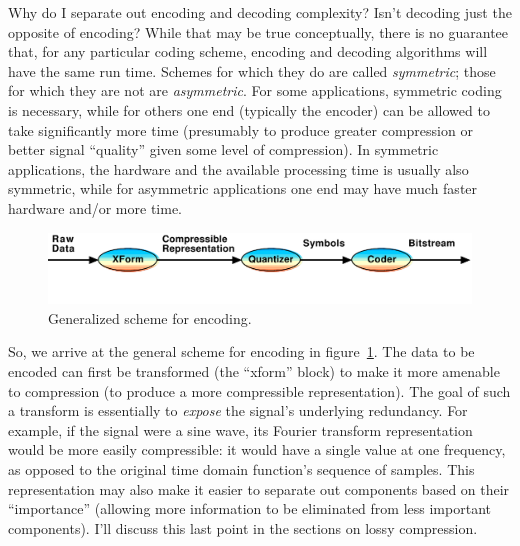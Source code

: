 Why do I separate out encoding and decoding complexity? Isn't decoding
just the opposite of encoding? While that may be true conceptually,
there is no guarantee that, for any particular coding scheme, encoding
and decoding algorithms will have the same run time. Schemes for which
they do are called \emph{symmetric}; those for which they are not are
\emph{asymmetric}.  For some applications, symmetric coding is
necessary, while for others one end (typically the encoder) can be
allowed to take significantly more time (presumably to produce greater
compression or better signal ``quality'' given some level of
compression). In symmetric applications, the hardware and the
available processing time is usually also symmetric, while for
asymmetric applications one end may have much faster hardware and/or
more time.

\begin{figure}
\centerline{\includegraphics[width=\textwidth]{ch-comp/encoding}}
\caption{Generalized scheme for encoding.\label{fg:encoding}}
\end{figure}

So, we arrive at the general scheme for encoding in
figure~\ref{fg:encoding}.  The data to be encoded can first be
transformed (the ``xform'' block) to make it more amenable to
compression (to produce a more compressible representation). The goal
of such a transform is essentially to \emph{expose} the signal's
underlying redundancy. For example, if the signal were a sine wave,
its Fourier transform representation would be more easily
compressible: it would have a single value at one frequency, as
opposed to the original time domain function's sequence of
samples. This representation may also make it easier to separate out
components based on their ``importance'' (allowing more information to
be eliminated from less important components).  I'll discuss this last
point in the sections on lossy compression.

